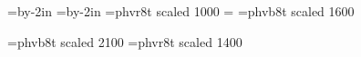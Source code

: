 \pdfpagewidth=210mm \pdfpageheight=297mm   %
\hsize=\pdfpagewidth \advance\hsize by-2in
\vsize=\pdfpageheight \advance\vsize by-2in
\font\footfont=phvr8t scaled 1000
\footline={\hss\footfont\folio\hss}
\font\titlefont=phvb8t scaled 1600
\def\title#1{\par\vskip6pt\centerline{\titlefont#1}\vskip5pt}

\font\headfont=phvb8t scaled 2100
\font\datefont=phvr8t scaled 1400

\raggedright
\nopagenumbers
